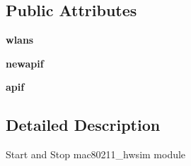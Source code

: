 \subsection*{Public Attributes}
\begin{DoxyCompactItemize}
\item 
\hypertarget{classmininet_1_1wifiModule_1_1module_a0bd0f08ed47a7e377717cc8944b59691}{{\bfseries wlans}}\label{classmininet_1_1wifiModule_1_1module_a0bd0f08ed47a7e377717cc8944b59691}

\item 
\hypertarget{classmininet_1_1wifiModule_1_1module_a96348e28c30ec61886895764ff842834}{{\bfseries newapif}}\label{classmininet_1_1wifiModule_1_1module_a96348e28c30ec61886895764ff842834}

\item 
\hypertarget{classmininet_1_1wifiModule_1_1module_ae09756834a8b766ad1feec8673014e92}{{\bfseries apif}}\label{classmininet_1_1wifiModule_1_1module_ae09756834a8b766ad1feec8673014e92}

\end{DoxyCompactItemize}


\subsection{Detailed Description}
\begin{DoxyVerb}Start and Stop mac80211_hwsim module \end{DoxyVerb}
 

